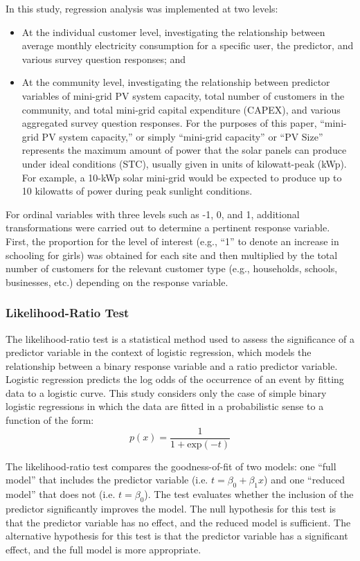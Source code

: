 In this study, regression analysis was implemented at two levels:
\begin{itemize}
	\item At the individual customer level, investigating the relationship between average monthly electricity consumption for a specific user, the predictor, and various survey question responses; and
	\item At the community level, investigating the relationship between predictor variables of mini-grid PV system capacity, total number of customers in the community, and total mini-grid capital expenditure (CAPEX), and various aggregated survey question responses. For the purposes of this paper, ``mini-grid PV system capacity,'' or simply ``mini-grid capacity'' or ``PV Size'' represents the maximum amount of power that the solar panels can produce under ideal conditions (STC), usually given in units of kilowatt-peak (kWp). For example, a 10-kWp solar mini-grid would be expected to produce up to 10 kilowatts of power during peak sunlight conditions.
\end{itemize}

For ordinal variables with three levels such as -1, 0, and 1, additional transformations were carried out to determine a pertinent response variable. First, the proportion for the level of interest (e.g., ``1'' to denote an increase in schooling for girls) was obtained for each site and then multiplied by the total number of customers for the relevant customer type (e.g., households, schools, businesses, etc.) depending on the response variable.

\subsubsection{Likelihood-Ratio Test}
\hfill \break
The likelihood-ratio test is a statistical method used to assess the significance of a predictor variable in the context of logistic regression, which models the relationship between a binary response variable and a ratio predictor variable. Logistic regression predicts the log odds of the occurrence of an event by fitting data to a logistic curve. This study considers only the case of simple binary logistic regressions in which the data are fitted in a probabilistic sense to a function of the form:
\begin{equation}
	p(x)=\frac{1}{1+\mathrm{exp}(-t)}
\end{equation}

The likelihood-ratio test compares the goodness-of-fit of two models: one ``full model'' that includes the predictor variable (i.e. $t=\beta_0+\beta_1x$) and one ``reduced model'' that does not (i.e. $t=\beta_0$). The test evaluates whether the inclusion of the predictor significantly improves the model. The null hypothesis for this test is that the predictor variable has no effect, and the reduced model is sufficient. The alternative hypothesis for this test is that the predictor variable has a significant effect, and the full model is more appropriate.

